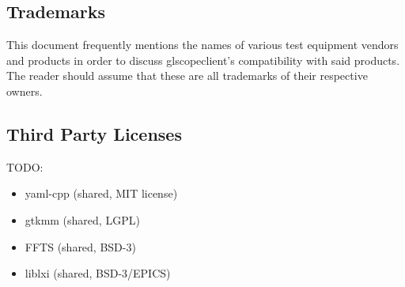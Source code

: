 \subsection{Trademarks}

This document frequently mentions the names of various test equipment vendors and products in order to discuss
glscopeclient's compatibility with said products. The reader should assume that these are all trademarks of their
respective owners.

\subsection{Third Party Licenses}

TODO:
\begin{itemize}
\item yaml-cpp (shared, MIT license)
\item gtkmm (shared, LGPL)
\item FFTS (shared, BSD-3)
\item liblxi (shared, BSD-3/EPICS)
\end{itemize}
